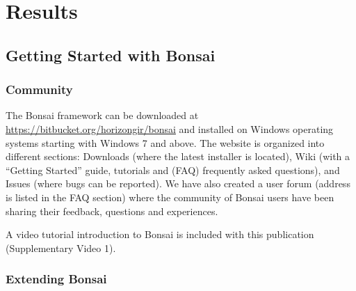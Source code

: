 				
\section{Results}

\subsection{Getting Started with Bonsai}

\subsubsection{Community}

The Bonsai framework can be downloaded at \url{https://bitbucket.org/horizongir/bonsai} and installed on Windows operating systems starting with Windows 7 and above. The website is organized into different sections: Downloads (where the latest installer is located), Wiki (with a “Getting Started” guide, tutorials and (FAQ) frequently asked questions), and Issues (where bugs can be reported). We have also created a user forum (address is listed in the FAQ section) where the community of Bonsai users have been sharing their feedback, questions and experiences.

A video tutorial introduction to Bonsai is included with this publication (Supplementary Video 1).

\subsubsection{Extending Bonsai}

